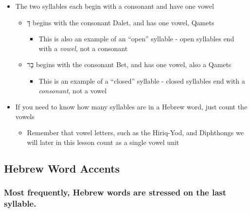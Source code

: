 \documentclass[
]{turabian-researchpaper}
\providecommand{\tightlist}{%
  \setlength{\itemsep}{0pt}\setlength{\parskip}{0pt}}
\begin{document}
\begin{itemize}
\tightlist
\item
  The two syllables each begin with a consonant and have one vowel

  \begin{itemize}
  \tightlist
  \item
    דָּ begins with the consonant Dalet, and has one vowel, Qamets

    \begin{itemize}
    \tightlist
    \item
      This is also an example of an ``open'' syllable - open syllables end with a \emph{vowel}, not a consonant
    \end{itemize}
  \item
    בָר begins with the consonant Bet, and has one vowel, also a Qamets

    \begin{itemize}
    \tightlist
    \item
      This is an example of a ``closed'' syllable - closed syllables end with a \emph{consonant}, not a vowel
    \end{itemize}
  \end{itemize}
\item
  If you need to know how many syllables are in a Hebrew word, just count the vowels

  \begin{itemize}
  \tightlist
  \item
    Remember that vowel letters, such as the Hiriq-Yod, and Diphthongs we will later in this lesson count as a single vowel unit
  \end{itemize}
\end{itemize}

\hypertarget{three_2}{%
\subsection{Hebrew Word Accents}\label{three_2}}

\hypertarget{most-frequently-hebrew-words-are-stressed-on-the-last-syllable.}{%
\subsubsection*{Most frequently, Hebrew words are stressed on the last syllable.}\label{most-frequently-hebrew-words-are-stressed-on-the-last-syllable.}}
\end{document}
